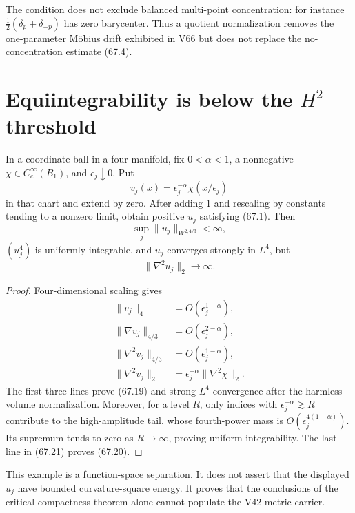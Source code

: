 \documentclass[11pt]{article}
\theoremstyle{remark}
\begin{document}
The condition does not exclude balanced multi-point
concentration: for instance
\(\tfrac12(\delta_p+\delta_{-p})\) has zero barycenter.  Thus a
quotient normalization removes the one-parameter M\"obius drift
exhibited in V66 but does not replace the no-concentration estimate
(67.4).

\section{Equiintegrability is below the \(H^2\) threshold}

\begin{counterexample}
\label{cnt:v15v67-h2-gap}
In a coordinate ball in a four-manifold, fix
\(0<\alpha<1\), a nonnegative
\(\chi\in C_c^\infty(B_1)\), and \(\epsilon_j\downarrow0\).  Put
\[
 v_j(x)=\epsilon_j^{-\alpha}
 \chi(x/\epsilon_j)                                   \tag{67.18}
\]
in that chart and extend by zero.  After adding \(1\) and
rescaling by constants tending to a nonzero limit, obtain positive
\(u_j\) satisfying (67.1).  Then
\[
 \sup_j\|u_j\|_{W^{2,4/3}}<\infty,                    \tag{67.19}
\]
\((u_j^4)\) is uniformly integrable, and \(u_j\) converges strongly
in \(L^4\), but
\[
 \|\nabla^2u_j\|_2\longrightarrow\infty.              \tag{67.20}
\]
\end{counterexample}

\begin{proof}
Four-dimensional scaling gives
\[
\begin{aligned}
 \|v_j\|_4&=O(\epsilon_j^{1-\alpha}),\\
 \|\nabla v_j\|_{4/3}&=O(\epsilon_j^{2-\alpha}),\\
 \|\nabla^2v_j\|_{4/3}&=O(\epsilon_j^{1-\alpha}),\\
 \|\nabla^2v_j\|_2&=
 \epsilon_j^{-\alpha}\|\nabla^2\chi\|_2.              \tag{67.21}
\end{aligned}
\]
The first three lines prove (67.19) and strong \(L^4\) convergence
after the harmless volume normalization.  Moreover, for a level
\(R\), only indices with
\(\epsilon_j^{-\alpha}\gtrsim R\) contribute to the high-amplitude
tail, whose fourth-power mass is
\(O(\epsilon_j^{4(1-\alpha)})\).  Its supremum tends to zero as
\(R\to\infty\), proving uniform integrability.  The last line in
(67.21) proves (67.20).
\end{proof}

This example is a function-space separation.  It does not assert
that the displayed \(u_j\) have bounded curvature-square energy.
It proves that the conclusions of the critical compactness theorem
alone cannot populate the V42 metric carrier.
\end{document}
